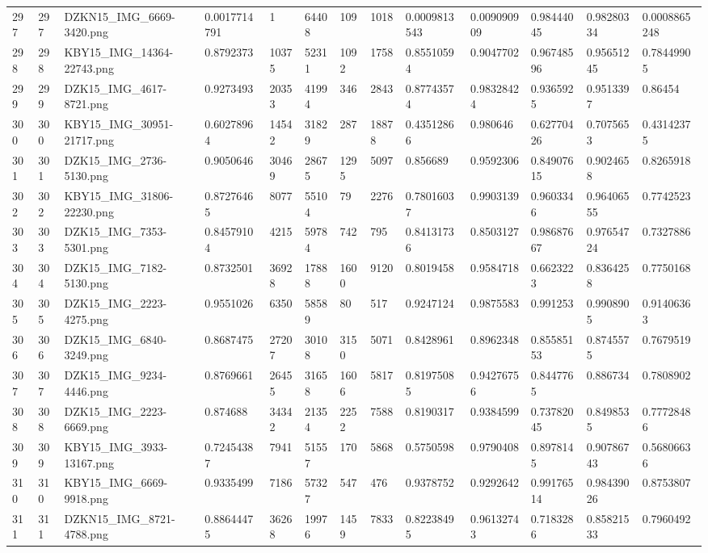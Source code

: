 \documentclass[11pt, a4paper, twoside]{report}
\begin{document}
\begin{longtable}[c]{@{}lllllllllllll@{}}
297 & 297 & DZKN15\_IMG\_6669-3420.png & 0.0017714791 & 1 & 64408 & 109 & 1018 & 0.0009813543 & 0.009090909 & 0.98444045 & 0.98280334 & 0.0008865248 \\
298 & 298 & KBY15\_IMG\_14364-22743.png & 0.8792373 & 10375 & 52311 & 1092 & 1758 & 0.85510594 & 0.9047702 & 0.96748596 & 0.95651245 & 0.78449905 \\
299 & 299 & DZK15\_IMG\_4617-8721.png & 0.9273493 & 20353 & 41994 & 346 & 2843 & 0.87743574 & 0.98328424 & 0.9365925 & 0.9513397 & 0.86454 \\
300 & 300 & KBY15\_IMG\_30951-21717.png & 0.60278964 & 14542 & 31829 & 287 & 18878 & 0.43512866 & 0.980646 & 0.62770426 & 0.7075653 & 0.43142375 \\
301 & 301 & DZK15\_IMG\_2736-5130.png & 0.9050646 & 30469 & 28675 & 1295 & 5097 & 0.856689 & 0.9592306 & 0.84907615 & 0.9024658 & 0.8265918 \\
302 & 302 & KBY15\_IMG\_31806-22230.png & 0.87276465 & 8077 & 55104 & 79 & 2276 & 0.78016037 & 0.9903139 & 0.9603346 & 0.96406555 & 0.7742523 \\
303 & 303 & DZK15\_IMG\_7353-5301.png & 0.84579104 & 4215 & 59784 & 742 & 795 & 0.84131736 & 0.8503127 & 0.98687667 & 0.97654724 & 0.7327886 \\
304 & 304 & DZK15\_IMG\_7182-5130.png & 0.8732501 & 36928 & 17888 & 1600 & 9120 & 0.8019458 & 0.9584718 & 0.6623223 & 0.8364258 & 0.7750168 \\
305 & 305 & DZK15\_IMG\_2223-4275.png & 0.9551026 & 6350 & 58589 & 80 & 517 & 0.9247124 & 0.9875583 & 0.991253 & 0.9908905 & 0.91406363 \\
306 & 306 & DZK15\_IMG\_6840-3249.png & 0.8687475 & 27207 & 30108 & 3150 & 5071 & 0.8428961 & 0.8962348 & 0.85585153 & 0.8745575 & 0.7679519 \\
307 & 307 & DZK15\_IMG\_9234-4446.png & 0.8769661 & 26455 & 31658 & 1606 & 5817 & 0.81975085 & 0.94276756 & 0.8447765 & 0.886734 & 0.7808902 \\
308 & 308 & DZK15\_IMG\_2223-6669.png & 0.874688 & 34342 & 21354 & 2252 & 7588 & 0.8190317 & 0.9384599 & 0.73782045 & 0.8498535 & 0.77728486 \\
309 & 309 & KBY15\_IMG\_3933-13167.png & 0.72454387 & 7941 & 51557 & 170 & 5868 & 0.5750598 & 0.9790408 & 0.8978145 & 0.90786743 & 0.56806636 \\
310 & 310 & KBY15\_IMG\_6669-9918.png & 0.9335499 & 7186 & 57327 & 547 & 476 & 0.9378752 & 0.9292642 & 0.99176514 & 0.98439026 & 0.8753807 \\
311 & 311 & DZKN15\_IMG\_8721-4788.png & 0.88644475 & 36268 & 19976 & 1459 & 7833 & 0.82238495 & 0.96132743 & 0.7183286 & 0.85821533 & 0.7960492 \\

\end{longtable}
\end{document}
